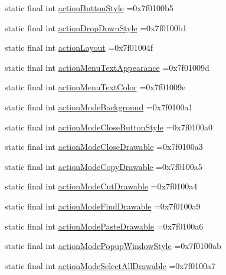 \begin{DoxyCompactItemize}
\item 
static final int \hyperlink{classcheck_1_1test_1_1_r_1_1attr_a3fc78aabb5334c90119bc8f0800b05c3}{action\+Button\+Style} =0x7f0100b5
\item 
static final int \hyperlink{classcheck_1_1test_1_1_r_1_1attr_a45269834542ea70d42dc68393312c539}{action\+Drop\+Down\+Style} =0x7f0100b1
\item 
static final int \hyperlink{classcheck_1_1test_1_1_r_1_1attr_ab4b527b5796f4512de117247dbd35351}{action\+Layout} =0x7f01004f
\item 
static final int \hyperlink{classcheck_1_1test_1_1_r_1_1attr_aeb2f5cb8f87508e1e6720da3ab4010aa}{action\+Menu\+Text\+Appearance} =0x7f01009d
\item 
static final int \hyperlink{classcheck_1_1test_1_1_r_1_1attr_a52d949c4652ebc1902752ce243b0f3c9}{action\+Menu\+Text\+Color} =0x7f01009e
\item 
static final int \hyperlink{classcheck_1_1test_1_1_r_1_1attr_a4b63c85a0ab6b03ffd464efc207712d8}{action\+Mode\+Background} =0x7f0100a1
\item 
static final int \hyperlink{classcheck_1_1test_1_1_r_1_1attr_ac21f2ad4b315654a87d0a11cb734236f}{action\+Mode\+Close\+Button\+Style} =0x7f0100a0
\item 
static final int \hyperlink{classcheck_1_1test_1_1_r_1_1attr_a3a9c3f760732e5561dc9790d43141bf7}{action\+Mode\+Close\+Drawable} =0x7f0100a3
\item 
static final int \hyperlink{classcheck_1_1test_1_1_r_1_1attr_ac1d1297be46cfa54f32f7903f5259324}{action\+Mode\+Copy\+Drawable} =0x7f0100a5
\item 
static final int \hyperlink{classcheck_1_1test_1_1_r_1_1attr_a691190563ca01ec16e2456ac64fc5a72}{action\+Mode\+Cut\+Drawable} =0x7f0100a4
\item 
static final int \hyperlink{classcheck_1_1test_1_1_r_1_1attr_a535b66e1a04df112a1eb7fc3a8c05b9a}{action\+Mode\+Find\+Drawable} =0x7f0100a9
\item 
static final int \hyperlink{classcheck_1_1test_1_1_r_1_1attr_aff7427a6bcd20189d4b6af36b92fccdd}{action\+Mode\+Paste\+Drawable} =0x7f0100a6
\item 
static final int \hyperlink{classcheck_1_1test_1_1_r_1_1attr_a9f20226af5f3450ddc9b63afe84c2e96}{action\+Mode\+Popup\+Window\+Style} =0x7f0100ab
\item 
static final int \hyperlink{classcheck_1_1test_1_1_r_1_1attr_a3c633deb9c01f4bdde7415f1db6815b0}{action\+Mode\+Select\+All\+Drawable} =0x7f0100a7
\item 

\end{DoxyCompactItemize}
